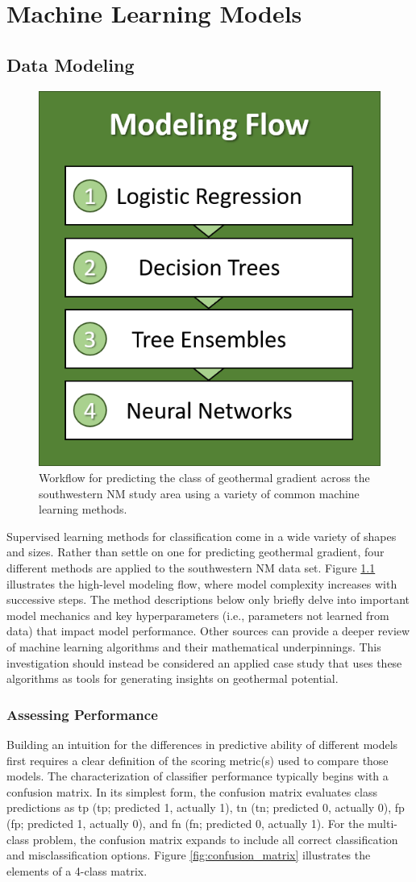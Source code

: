 \chapter{Machine Learning Models}\label{ch5:expl_applied}

\section{Data Modeling}

\begin{figure}
\centering
\includegraphics[width=.35\textwidth]{templates/images/Flow-Modeling.png}
\singlespacing
\caption[Modeling workflow]{Workflow for predicting the class of geothermal gradient across the southwestern NM study area using a variety of common machine learning methods.}
\label{fig:model_flow}
\end{figure}

Supervised learning methods for classification come in a wide variety of shapes and sizes. Rather than settle on one for predicting geothermal gradient, four different methods are applied to the southwestern NM data set. Figure \ref{fig:model_flow} illustrates the high-level modeling flow, where model complexity increases with successive steps. The method descriptions below only briefly delve into important model mechanics and key hyperparameters (i.e., parameters not learned from data) that impact model performance. Other sources can provide a deeper review of machine learning algorithms and their mathematical underpinnings. This investigation should instead be considered an applied case study that uses these algorithms as tools for generating insights on geothermal potential. 

\subsection{Assessing Performance}
Building an intuition for the differences in predictive ability of different models first requires a clear definition of the scoring metric(s) used to compare those models. The characterization of classifier performance typically begins with a confusion matrix. In its simplest form, the confusion matrix evaluates class predictions as \acrlong{tp} (\acrshort{tp}; predicted 1, actually 1), \acrlong{tn} (\acrshort{tn}; predicted 0, actually 0), \acrlong{fp} (\acrshort{fp}; predicted 1, actually 0), and \acrlong{fn} (\acrshort{fn}; predicted 0, actually 1). For the multi-class problem, the confusion matrix expands to include all correct classification and misclassification options. Figure \ref{fig:confusion_matrix} illustrates the elements of a 4-class matrix.

